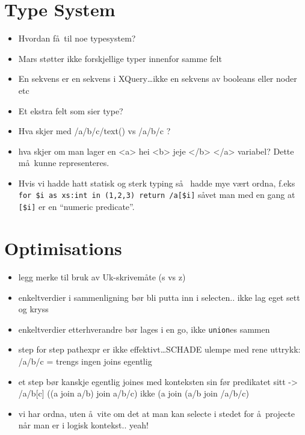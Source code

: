 \section{Type System}
\label{sect:discussion:typeSystem}
\begin{itemize}
  \item Hvordan f\aa~til noe typesystem?
  \item Mars st\o tter ikke forskjellige typer innenfor samme felt
  \item En sekvens er en sekvens i XQuery\ldots ikke en sekvens av booleans
  eller noder etc
  \item Et ekstra felt som sier type?
  \item Hva skjer med /a/b/c/text() vs /a/b/c ?
  \item hva skjer om man lager en <a> hei <b> jeje </b> </a> variabel? Dette
  m\aa~kunne representeres.
  \item Hvis vi hadde hatt statisk og sterk typing s\aa~ hadde mye v\ae rt
  ordna, f.eks \verb!for $i as xs:int in (1,2,3) return /a[$i]! s\aa vet man
  med en gang at \verb![$i]! er en ``numeric predicate''.
\end{itemize}

\section{Optimisations}
\label{sect:discussion:optimisations}
\begin{itemize}
  \item legg merke til bruk av Uk-skrivem\aa te (s vs z)
  \item enkeltverdier i sammenligning b\o r bli putta inn i selecten.. ikke lag
  eget sett og kryss
  \item enkeltverdier etterhverandre b\o r lages i en go, ikke \texttt{union}es
  sammen
  \item step for step pathexpr er ikke effektivt\ldots SCHADE ulempe med rene uttrykk: /a/b/c = trengs ingen
  joins egentlig
  \item et step b\o r kanskje egentlig joines med konteksten sin f\o r predikatet sitt -> /a/b[c] ((a join a/b)
  join a/b/c) ikke (a join (a/b join /a/b/c)
  \item vi har ordna, uten \aa~vite om det at man kan selecte i stedet for \aa~projecte n\aa r man er i logisk
  kontekst.. yeah!
\end{itemize}